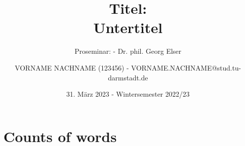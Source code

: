 \documentclass[
	ngerman, 
	fontsize=9pt,
	accentcolor=1b,%
	type=intern,
	marginpar=false,
	custommargins=geometry
	]{tudapub}
\let\endcm=\endlist
\newcommand\wordcount{
}
\begin{document}
\title{Titel: \\ Untertitel}
\subtitle{Proseminar:  - Dr. phil. Georg Elser}
\author{VORNAME NACHNAME (123456) - VORNAME.NACHNAME@stud.tu-darmstadt.de }
\date{31. März 2023 - Wintersemester 2022/23} %

\maketitle
{} 
\fontsize{12pt}{14.4}\selectfont %

\tableofcontents
\newpage


\section*{Counts of words} 
\begin{cm}
\wordcount	
\end{cm}

\listoftodos

\begin{cm}

\end{cm}
\endcm



\end{document}
